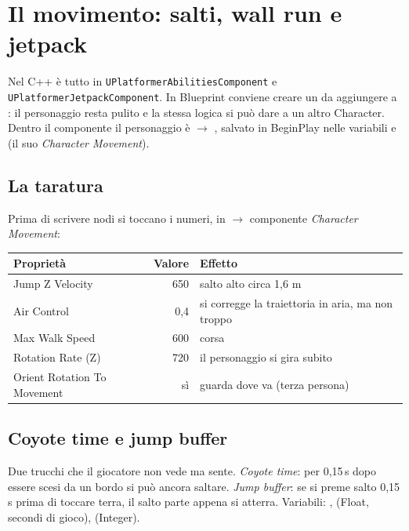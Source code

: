 \section{Il movimento: salti, wall run e jetpack}

Nel C++ è tutto in \texttt{UPlatformerAbilitiesComponent} e \texttt{UPlatformerJetpackComponent}. In Blueprint conviene creare un   da aggiungere a : il personaggio resta pulito e la stessa logica si può dare a un altro Character. Dentro il componente il personaggio è  $\rightarrow$ , salvato in BeginPlay nelle variabili  e  (il suo \emph{Character Movement}).

\subsection{La taratura}

Prima di scrivere nodi si toccano i numeri, in  $\rightarrow$ componente \emph{Character Movement}:

\begin{center}
\begin{tabular}{lrl}
\toprule
Proprietà & Valore & Effetto \\
\midrule
Jump Z Velocity & 650 & salto alto circa 1,6 m \\
Air Control & 0,4 & si corregge la traiettoria in aria, ma non troppo \\
Max Walk Speed & 600 & corsa \\
Rotation Rate (Z) & 720 & il personaggio si gira subito \\
Orient Rotation To Movement & sì & guarda dove va (terza persona) \\
\bottomrule
\end{tabular}
\end{center}

\subsection{Coyote time e jump buffer}

Due trucchi che il giocatore non vede ma sente. \emph{Coyote time}: per 0,15\,s dopo essere scesi da un bordo si può ancora saltare. \emph{Jump buffer}: se si preme salto 0,15\,s prima di toccare terra, il salto parte appena si atterra.
Variabili: ,  (Float, secondi di gioco),  (Integer).

